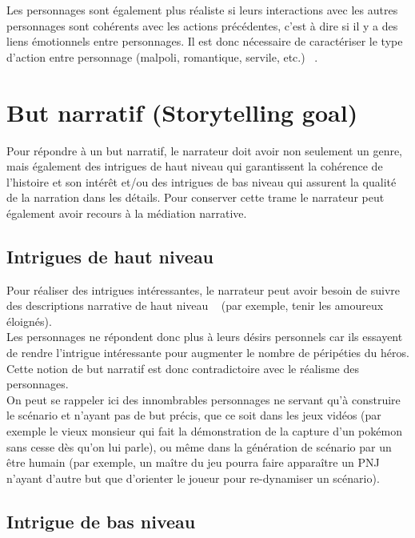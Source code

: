 \documentclass[asi]{picINSA}
\begin{document}
Les personnages sont également plus réaliste si leurs interactions avec les autres personnages sont cohérents avec les actions précédentes, c'est à dire si il y a des liens émotionnels entre personnages. Il est donc nécessaire de caractériser le type d'action entre personnage (malpoli, romantique, servile, etc.) ~\cite{IRIS:conf/aamas/CavazzaCM2002}. \\

\section{But narratif (Storytelling goal)}

Pour répondre à un but narratif, le narrateur doit avoir non seulement un genre, mais également des intrigues de haut niveau
qui garantissent la cohérence de l'histoire et son intérêt et/ou des intrigues de bas niveau qui assurent la qualité de la narration dans les détails. Pour conserver cette trame le narrateur peut également avoir recours à la médiation narrative.

\subsection{Intrigues de haut niveau}

Pour réaliser des intrigues intéressantes, le narrateur peut avoir besoin de suivre des descriptions narrative de haut niveau
~\cite{Ciarlini:2010:ERP:1658866.1658874} (par exemple, tenir les amoureux éloignés). \\
Les personnages ne répondent donc plus à leurs désirs personnels car ils essayent de rendre l'intrigue intéressante
pour augmenter le nombre de péripéties du héros. Cette notion de but narratif est donc contradictoire avec le réalisme
des personnages. \\

On peut se rappeler ici des innombrables personnages ne servant qu'à construire le scénario et n'ayant pas de but précis,
que ce soit dans les jeux vidéos (par exemple le vieux monsieur qui fait la démonstration de la capture d'un pokémon sans cesse
dès qu'on lui parle), ou même dans la génération de scénario par un être humain (par exemple, un maître du jeu pourra faire
 apparaître un PNJ n'ayant d'autre but que d'orienter le joueur pour re-dynamiser un scénario). \\

\subsection{Intrigue de bas niveau}
\end{document}
